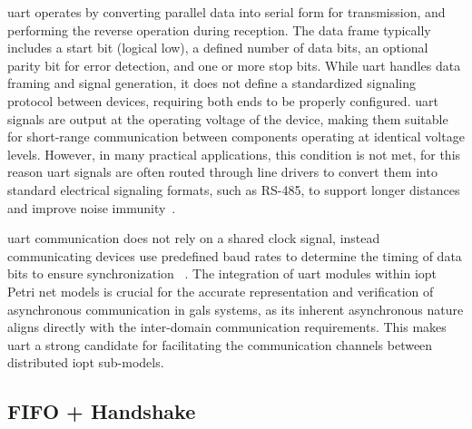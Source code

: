 \gls{uart} operates by converting parallel data into serial form for transmission, and performing the reverse operation during reception. The data frame typically includes a start bit (logical low), a defined number of data bits, an optional parity bit for error detection, and one or more stop bits. While \gls{uart} handles data framing and signal generation, it does not define a standardized signaling protocol between devices, requiring both ends to be properly configured. \gls{uart} signals are output at the operating voltage of the device, making them suitable for short-range communication between components operating at identical voltage levels. However, in many practical applications, this condition is not met, for this reason  \gls{uart} signals are often routed through line drivers to convert them into standard electrical signaling formats, such as RS-485, to support longer distances and improve noise immunity~\cite{Rao2021}.

\gls{uart} communication does not rely on a shared clock signal, instead communicating devices use predefined baud rates to determine the timing of data bits to ensure synchronization ~\cite{UARTard}. The integration of \gls{uart} modules within \gls{iopt} Petri net models is crucial for the accurate representation and verification of asynchronous communication in \gls{gals} systems, as its inherent asynchronous nature aligns directly with the inter-domain communication requirements. This makes \gls{uart} a strong candidate for facilitating the communication channels between distributed \gls{iopt} sub-models. 




\subsection{FIFO +  Handshake}
\label{sub:fifo+handshake}

